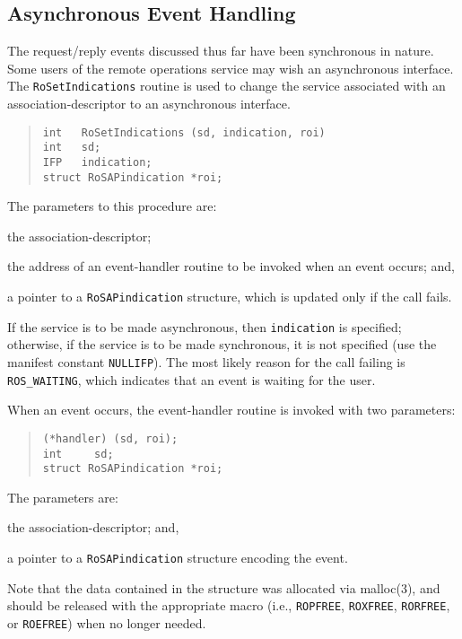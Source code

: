 \subsection     {Asynchronous Event Handling}
The request/reply events discussed thus far have been synchronous in nature.
Some users of the remote operations service may wish an asynchronous interface.
The \verb"RoSetIndications" routine is used to change the service associated
with an association-descriptor to an asynchronous interface.
\begin{quote}\small\begin{verbatim}
int   RoSetIndications (sd, indication, roi)
int   sd;
IFP   indication;
struct RoSAPindication *roi;
\end{verbatim}\end{quote}
The parameters to this procedure are:
\begin{describe}
\item[\verb"sd":] the association-descriptor;

\item[\verb"indication":] the address of an event-handler routine to be
invoked when an event occurs;
and,

\item[\verb"roi":] a pointer to a \verb"RoSAPindication" structure, which is
updated only if the call fails.
\end{describe}
If the service is to be made asynchronous,
then \verb"indication" is specified;
otherwise,
if the service is to be made synchronous,
it is not specified (use the manifest constant \verb"NULLIFP").
The most likely reason for the call failing is \verb"ROS_WAITING",
which indicates that an event is waiting for the user.

When an event occurs,
the event-handler routine is invoked with two parameters:
\begin{quote}\small\begin{verbatim}
(*handler) (sd, roi);
int     sd;
struct RoSAPindication *roi;
\end{verbatim}\end{quote}
The parameters are:
\begin{describe}
\item[\verb"sd":] the association-descriptor;
and,

\item[\verb"roi":] a pointer to a \verb"RoSAPindication" structure encoding
the event.
\end{describe}
Note that the data contained in the structure was allocated via \man malloc(3),
and should be released with the appropriate macro
(i.e., \verb"ROPFREE", \verb"ROXFREE", \verb"RORFREE", or \verb"ROEFREE")
when no longer needed.

